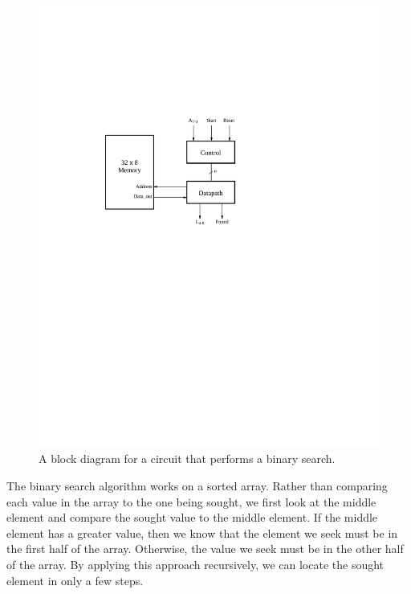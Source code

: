 \documentclass[epsfig,10pt,fullpage]{article}
\begin{document}
\begin{figure}[H]
	\begin{center}
		\includegraphics[]{figures/binary_search_circuit.pdf}
	\end{center}
\caption{A block diagram for a circuit that performs a binary search.}
\label{fig:binary_search_cct}
\end{figure}

The binary search algorithm works on a sorted array. Rather than comparing each value in 
the array to the one being sought, we first look at the middle element
and compare the sought value to the middle element. If the middle element has a greater value, 
then we know that the element we seek must be in the first half of the array. Otherwise, the 
value we seek must be in the other half of the array. By applying this approach recursively, 
we can locate the sought element in only a few steps.
\end{document}
